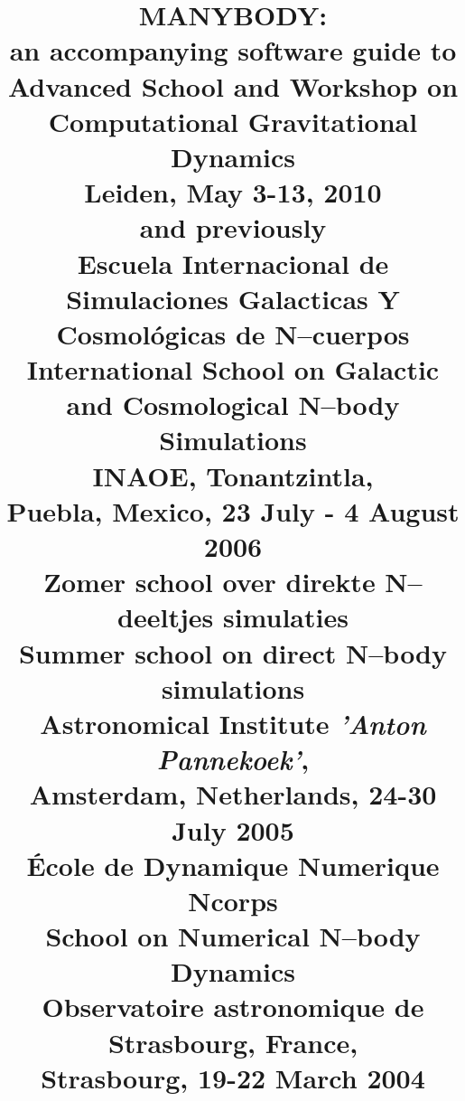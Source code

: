 

\nonstopmode			%


\documentclass[headsepline,normalheadings]{book}

\setlength{\textwidth}{6.5in}
\setlength{\oddsidemargin}{0.0in}
\setlength{\evensidemargin}{0.0in}

\setlength{\parindent}{0pt}
\setlength{\parskip}{2.5mm}


\usepackage{epsfig}


\usepackage{html}
\usepackage{nemo}

\title{ 
  {\Huge MANYBODY:} \\
  {\LARGE an accompanying software guide to }\\
  {\bf  Advanced School and Workshop on Computational Gravitational Dynamics } \\
  { Leiden, May 3-13, 2010} \\
  {\small and previously} \\
  {\bf  Escuela Internacional de Simulaciones Galacticas Y Cosmol\'ogicas de N--cuerpos} \\
  {\bf  International School on Galactic and Cosmological N--body Simulations} \\
  { INAOE, Tonantzintla, \\
    Puebla, Mexico, 23 July - 4 August 2006}\\
  {\bf  Zomer school over direkte N--deeltjes simulaties} \\
  {\bf  Summer school on direct N--body simulations} \\
  { Astronomical Institute {\it 'Anton Pannekoek'}, \\
    Amsterdam, Netherlands, 24-30 July 2005}\\
  { \bf \'Ecole de Dynamique Numerique Ncorps }\\
  { \bf School on Numerical N--body Dynamics }\\
  { Observatoire astronomique de Strasbourg, France, \\
    Strasbourg, 19-22 March 2004}
}

